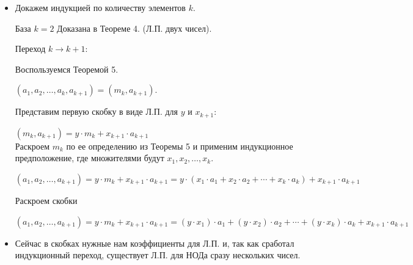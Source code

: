 \documentclass[a4paper, 12pt]{article}
\begin{document}
\begin{itemize}
	
\item Докажем индукцией по количеству элементов $k$.

База $k = 2$ Доказана в Теореме 4. (Л.П. двух чисел).

Переход $k \rightarrow k + 1$:

Воспользуемся Теоремой 5.

$(a_1, a_2, \hdots, a_k, a_{k+1}) = (m_k, a_{k+1}).$

Представим первую скобку в виде Л.П. для $y$ и $x_{k+1}$:

$(m_k, a_{k+1}) = y \cdot m_k + x_{k+1} \cdot a_{k+1}$\\

Раскроем $m_k$ по ее определению из Теоремы 5 и применим индукционное предположение, где множителями будут $x_1, x_2, \hdots, x_k.$

$(a_1, a_2, \hdots, a_{k+1}) =  y \cdot m_k + x_{k+1} \cdot a_{k+1} = y \cdot (x_1 \cdot a_1 + x_2 \cdot a_2 + \cdots + x_k \cdot a_k) + x_{k+1} \cdot a_{k+1}$

Раскроем скобки

$(a_1, a_2, \hdots, a_{k+1}) =  y \cdot m_k + x_{k+1} \cdot a_{k+1} = (y \cdot x_1) \cdot a_1 + (y \cdot x_2) \cdot a_2 + \cdots + (y \cdot x_k) \cdot a_k + x_{k+1} \cdot a_{k+1}$

\item Сейчас в скобках нужные нам коэффициенты для Л.П. и, так как сработал индукционный переход, существует Л.П. для НОДа сразу нескольких чисел.

\end{itemize}
\end{document}
